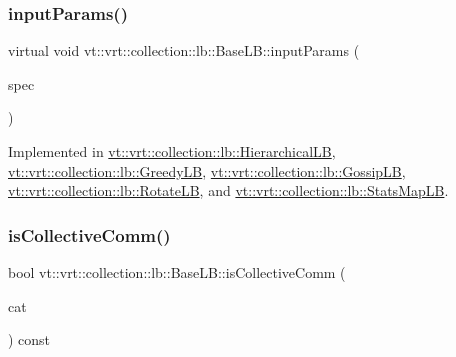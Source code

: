 \mbox{\label{structvt_1_1vrt_1_1collection_1_1lb_1_1_base_l_b_a555e29aadfd428383464d6dd007506b6}} 
\subsubsection{\texorpdfstring{input\+Params()}{inputParams()}}
{\footnotesize\ttfamily virtual void vt\+::vrt\+::collection\+::lb\+::\+Base\+L\+B\+::input\+Params (\begin{DoxyParamCaption}\item[{\hyperlink{structvt_1_1vrt_1_1collection_1_1balance_1_1_spec_entry}{balance\+::\+Spec\+Entry} $\ast$}]{spec }\end{DoxyParamCaption})\hspace{0.3cm}{\ttfamily [pure virtual]}}



Implemented in \hyperlink{structvt_1_1vrt_1_1collection_1_1lb_1_1_hierarchical_l_b_a5648ef8b00795a3ecfb2e07a4ee44345}{vt\+::vrt\+::collection\+::lb\+::\+Hierarchical\+LB}, \hyperlink{structvt_1_1vrt_1_1collection_1_1lb_1_1_greedy_l_b_aec90a76fdcb1d57c9edfb6403bcc5181}{vt\+::vrt\+::collection\+::lb\+::\+Greedy\+LB}, \hyperlink{structvt_1_1vrt_1_1collection_1_1lb_1_1_gossip_l_b_abc000890ad1743faae2fe853d73485bb}{vt\+::vrt\+::collection\+::lb\+::\+Gossip\+LB}, \hyperlink{structvt_1_1vrt_1_1collection_1_1lb_1_1_rotate_l_b_a70fc0a77f387632fc57805950b63f443}{vt\+::vrt\+::collection\+::lb\+::\+Rotate\+LB}, and \hyperlink{structvt_1_1vrt_1_1collection_1_1lb_1_1_stats_map_l_b_a495d91782f11c1bb5d1774a05b2a73f6}{vt\+::vrt\+::collection\+::lb\+::\+Stats\+Map\+LB}.

\mbox{\label{structvt_1_1vrt_1_1collection_1_1lb_1_1_base_l_b_ab13d4ad9a3523ef5416ea4f3558a06df}} 
\subsubsection{\texorpdfstring{is\+Collective\+Comm()}{isCollectiveComm()}}
{\footnotesize\ttfamily bool vt\+::vrt\+::collection\+::lb\+::\+Base\+L\+B\+::is\+Collective\+Comm (\begin{DoxyParamCaption}\item[{\hyperlink{namespacevt_1_1vrt_1_1collection_1_1balance_a9cc6c6884ca0416dae824e9204093c57}{balance\+::\+Comm\+Category}}]{cat }\end{DoxyParamCaption}) const\hspace{0.3cm}{\ttfamily [protected]}}

